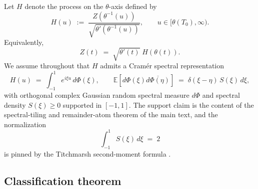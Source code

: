 \documentclass[11pt]{amsart}
\theoremstyle{definition}
\begin{document}
Let $H$ denote the process on the $\theta$-axis defined by
\begin{equation}\label{eq:Hdef}
H(u) \;:=\; \frac{Z(\theta^{-1}(u))}{\sqrt{\theta'(\theta^{-1}(u))}},
\qquad u\in[\theta(T_{0}),\infty).
\end{equation}
Equivalently,
\begin{equation}\label{eq:Zfromh}
Z(t) \;=\; \sqrt{\theta'(t)}\;H(\theta(t)).
\end{equation}
We assume throughout that $H$ admits a Cram\'er spectral representation
\begin{equation}\label{eq:cramer}
H(u) \;=\; \int_{-1}^{1} e^{i\xi u}\,d\Phi(\xi),
\qquad \mathbb{E}\!\left[d\Phi(\xi)\overline{d\Phi(\eta)}\right]
\;=\; \delta(\xi-\eta)\,S(\xi)\,d\xi,
\end{equation}
with orthogonal complex Gaussian random spectral measure $d\Phi$ and
spectral density $S(\xi)\ge 0$ supported in $[-1,1]$. The support
claim is the content of the spectral-tiling and remainder-atom theorem of
the main text, and the normalization
\begin{equation}\label{eq:titchmarsh-norm}
\int_{-1}^{1}S(\xi)\,d\xi \;=\; 2
\end{equation}
is pinned by the Titchmarsh second-moment formula \cite{Titchmarsh}.

\subsection{Classification theorem}
\end{document}

